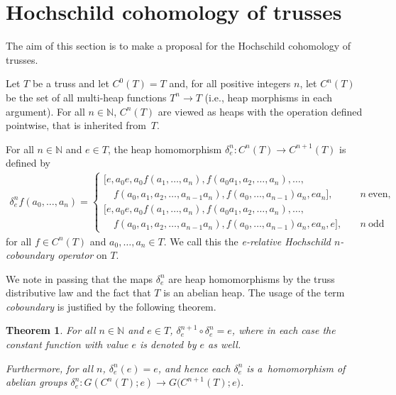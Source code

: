 \documentclass[pdftex]{sigma}
\numberwithin{equation}{section}
\newtheorem{Theorem}{Theorem}[section]
\newcommand{\N}{\mathbb N}
\begin{document}
\section{Hochschild cohomology of trusses}
The aim of this section is to make a proposal for the Hochschild cohomology of trusses.
\begin{Definition}\label{def.cob}
Let $T$ be a truss and let $C^0(T) = T$ and, for all positive integers $n$, let $C^n(T)$ be the set of all multi-heap functions $T^n\to T$ (i.e., heap morphisms in each argument). For all $n \in \N$, $C^n(T)$ are viewed as heaps with the operation defined pointwise, that is inherited from~$T$.

For all $n \in \N$ and $e\in T$, the heap homomorphism $\delta_e^n\colon C^n(T)\to C^{n+1}(T)$ is defined by
\begin{align*}
 \delta^n_e f(a_0,\dots,a_n) =
 \begin{cases}
 [e, a_0 e, a_0 f(a_1,\dots,a_n), f(a_0a_1, a_2, \dots, a_n), \dots,& \\
 \quad f(a_0,a_1, a_2, \dots, a_{n-1}a_n), f(a_0,\dots,a_{n-1})a_n, ea_n], \quad & n \ \text{even},\\
 [e, a_0 e, a_0 f(a_1,\dots,a_n), f(a_0a_1, a_2, \dots, a_n), \dots, & \\
 \quad f(a_0,a_1, a_2, \dots, a_{n-1}a_n), f(a_0,\dots,a_{n-1})a_n, ea_n, e], \quad &n \ \text{odd} \end{cases}
\end{align*}
for all $f\in C^n(T)$ and $a_0, \dots ,a_n \in T$. We call this the \textit{e-relative Hochschild $n$-coboundary operator} on $T$.
\end{Definition}
We note in passing that the maps $\delta_e^n$ are heap homomorphisms by the truss distributive law and the fact that $T$ is an abelian heap. The usage of the term {\em coboundary} is justified by the following theorem.

\begin{Theorem} \label{deltathme}
For all $n\in \N$ and $e\in T$,
$\delta^{n+1}_e \circ \delta^{n}_e = e$,
where in each case the constant function with value $e$ is denoted by $e$ as well.

Furthermore, for all $n$, $\delta_e^n(e) = e$, and hence each $\delta^n_e$ is a~homomorphism of abelian groups $\delta_e^n\colon G(C^n(T);e) \to G\big(C^{n+1}(T);e\big)$.
\end{Theorem}
\end{document}
